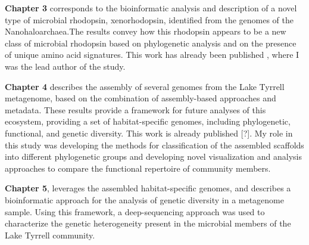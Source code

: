 \textbf{Chapter 3} corresponds to the bioinformatic analysis and description of a novel type of microbial rhodopsin, xenorhodopsin, identified from the genomes of the Nanohaloarchaea.The results convey how this rhodopsin appears to be a new class of microbial rhodopsin based on phylogenetic analysis and on the presence of unique amino acid signatures. This work has already been published \cite{Ugalde:2011fw}, where I was the lead author of the study. 

\textbf{Chapter 4} describes the assembly of several genomes from the Lake Tyrrell metagenome, based on the combination of assembly-based approaches and metadata. These results provide a framework for future analyses of this ecosystem, providing a set of habitat-specific genomes, including phylogenetic, functional, and genetic diversity. This work is already published \cite{Podell:2013kx}[?]. My role in this study was developing the methods for classification of the assembled scaffolds into different phylogenetic groups and developing novel visualization and analysis approaches to compare the functional repertoire of community members.

\textbf{Chapter 5}, leverages the assembled habitat-specific genomes, and describes a bioinformatic approach for the analysis of genetic diversity in a metagenome sample. Using this framework, a deep-sequencing approach was used to characterize the genetic heterogeneity present in the microbial members of the Lake Tyrrell community. 

